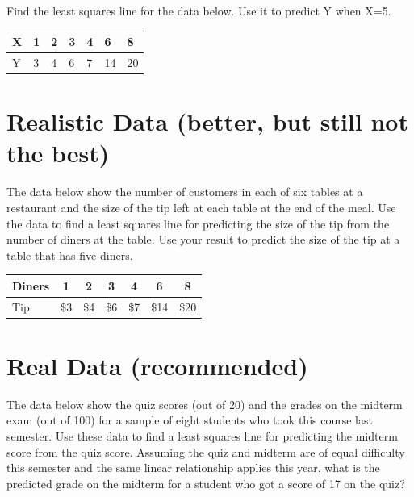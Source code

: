 \documentclass[twoside,openany]{tufte-book}
\begin{document}
Find the least squares  line for the data below.  Use it to predict Y when X=5.

\begin{table}[!ht]
\begin{center}
\begin{tabular}{|l|l|l|l|l|l|l|}
\hline
X & 1 & 2 & 3 & 4 & 6 & 8\\
\hline
Y & 3 & 4 & 6 & 7 & 14 & 20\\
\hline
\end{tabular}
\end{center}
\end{table}



\section{\textbf{Realistic Data (better, but still not the best)}}

The data below show the number of customers in each of six tables at a restaurant and the size of the tip left at each table at the end of the meal.  Use the data to find a least squares line for predicting the size of the tip from the number of diners at the table.  Use your result to predict the size of the tip at a table that has five diners. 

\begin{table}[!ht]
\begin{center}
\begin{tabular}{|l|c|c|c|c|c|c|}
\hline
Diners & 1 & 2 & 3 & 4 & 6 & 8\\
\hline
Tip & \$3 & \$4 & \$6 & \$7 & \$14 & \$20\\
\hline
\end{tabular}
\end{center}
\end{table}


\newpage
\section{\textbf{Real Data (recommended)}}

The data below  show the quiz scores (out of 20) and the grades on the midterm exam (out of 100) for a sample of eight students who took this course last semester.  Use these data to find a least squares line for predicting the midterm score from the quiz score. 
Assuming the quiz and midterm are of equal difficulty this semester and the same linear relationship applies this year, what is the predicted grade on the midterm for a student who got a score of 17 on the quiz? 
\end{document}
